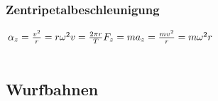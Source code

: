 \begin{multicols}{3}
	\subsubsection{Zentripetalbeschleunigung}
	$\alpha_{z} = \frac{v^2}{r} = r\omega^2 \\
	v = \frac{2\pi r}{T} \\
	F_{z} = ma_{z} = \frac{mv^2}{r} = m\omega^2r$ \\
	\\
\end{multicols}

\newpage
	\subsection{Wurfbahnen}
	
